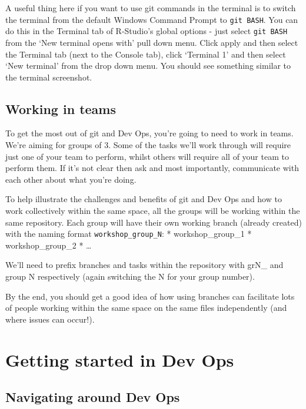 \documentclass[
  12pt,
]{article}
\begin{document}
A useful thing here if you want to use git commands in the terminal is
to switch the terminal from the default Windows Command Prompt to
\texttt{git\ BASH}. You can do this in the Terminal tab of R-Studio's
global options - just select \texttt{git\ BASH} from the `New terminal
opens with' pull down menu. Click apply and then select the Terminal tab
(next to the Console tab), click `Terminal 1' and then select `New
terminal' from the drop down menu. You should see something similar to
the terminal screenshot.

\hypertarget{working-in-teams}{%
\subsection{Working in teams}\label{working-in-teams}}

To get the most out of git and Dev Ops, you're going to need to work in
teams. We're aiming for groups of 3. Some of the tasks we'll work
through will require just one of your team to perform, whilst others
will require all of your team to perform them. If it's not clear then
ask and most importantly, communicate with each other about what you're
doing.

To help illustrate the challenges and benefits of git and Dev Ops and
how to work collectively within the same space, all the groups will be
working within the same repository. Each group will have their own
working branch (already created) with the naming format
\texttt{workshop\_group\_N}: * workshop\_group\_1 * workshop\_group\_2 *
\ldots{}

We'll need to prefix branches and tasks within the repository with grN\_
and group N respectively (again switching the N for your group number).

By the end, you should get a good idea of how using branches can
facilitate lots of people working within the same space on the same
files independently (and where issues can occur!).

\newpage

\hypertarget{getting-started-in-dev-ops}{%
\section{Getting started in Dev Ops}\label{getting-started-in-dev-ops}}

\hypertarget{navigating-around-dev-ops}{%
\subsection{Navigating around Dev Ops}\label{navigating-around-dev-ops}}
\end{document}

